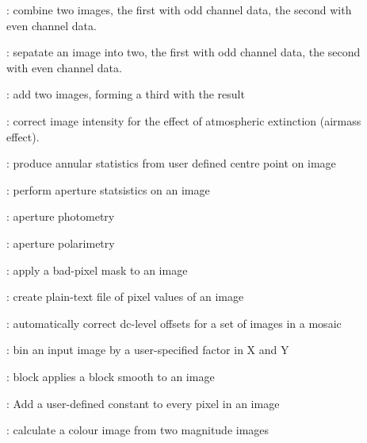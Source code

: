 \begin{description}

\item []: combine two images, the first with odd
channel data, the second with even channel data.

\item []: sepatate an image into two, the first
with odd channel data, the second with even channel data.

\item []: add two images, forming a third with the result

\item []: correct image intensity for the
effect of atmospheric extinction (airmass effect).

\item []: produce annular statistics from
user defined centre point on image

\item []: perform aperture statsistics on an image

\item []: aperture photometry

\item []: aperture polarimetry

\item []: apply a bad-pixel mask to an image

\item []: create plain-text file of pixel
values of an image

\item []: automatically correct dc-level
offsets for a set of images in a mosaic

\item []: bin an input image by a user-specified
factor in X and Y

\item []: block applies a block smooth to an image

\item []: Add a user-defined constant to every
pixel in an image

\item []: calculate a colour image from two
magnitude images


\end{description}
